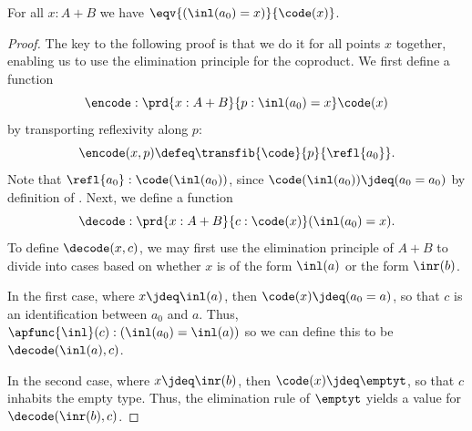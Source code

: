 %
\begin{thm}\label{thm:path-coprod}
  For all $x:A+B$ we have $\eqv{(\inl(a_0)=x)}{\code(x)}$.
\end{thm}

\begin{proof}
  The key to the following proof is that we do it for all points $x$ together, enabling us to use the elimination principle for the coproduct.
  We first define a function
  \[ \encode : \prd{x:A+B}{p:\inl(a_0)=x} \code(x) \]
  by transporting reflexivity along $p$:
  \[ \encode(x,p) \defeq \transfib{\code}{p}{\refl{a_0}}. \]
  Note that $\refl{a_0} : \code(\inl(a_0))$, since $\code(\inl(a_0))\jdeq (a_0=a_0)$ by definition of \code.
  Next, we define a function
  \[ \decode : \prd{x:A+B}{c:\code(x)} (\inl(a_0)=x). \]
  To define $\decode(x,c)$, we may first use the elimination principle of $A+B$ to divide into cases based on whether $x$ is of the form $\inl(a)$ or the form $\inr(b)$.

  In the first case, where $x\jdeq \inl(a)$, then $\code(x)\jdeq (a_0=a)$, so that $c$ is an identification between $a_0$ and $a$.
  Thus, $\apfunc{\inl}(c):(\inl(a_0)=\inl(a))$ so we can define this to be $\decode(\inl(a),c)$.

  In the second case, where $x\jdeq \inr(b)$, then $\code(x)\jdeq \emptyt$, so that $c$ inhabits the empty type.
  Thus, the elimination rule of $\emptyt$ yields a value for $\decode(\inr(b),c)$.


\end{proof}

